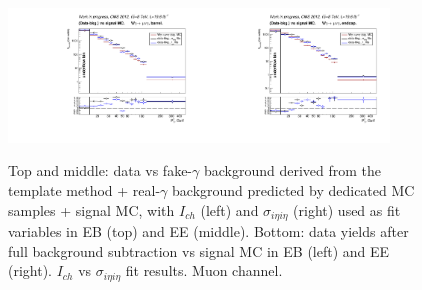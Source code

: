 \begin{figure}[htb]
\begin{center}
\includegraphics[width=0.45\textwidth]{../figs/figs_v11/MUON_WGamma/PrepareYields/c_BkgSubtrDATAvsSIGMC_c_MUON_WGamma__UNblind__Barrel__phoEt.pdf}\includegraphics[width=0.45\textwidth]{../figs/figs_v11/MUON_WGamma/PrepareYields/c_BkgSubtrDATAvsSIGMC_c_MUON_WGamma__UNblind__Endcap__phoEt.pdf}\\
  \caption{Top and middle: data vs fake-$\gamma$ background derived from the template method + real-$\gamma$ background predicted by dedicated MC samples + signal MC, with $I_{ch}$ (left) and $\sigma_{i\eta i\eta}$ (right) used as fit variables in EB (top) and EE (middle). Bottom: data yields after full background subtraction vs signal MC in EB (left) and EE (right). $I_{ch}$ vs $\sigma_{i\eta i\eta}$ fit results. Muon channel.}
  \label{fig:DDvsMC_Wg_Data_MUON}
  \end{center}
\end{figure}

